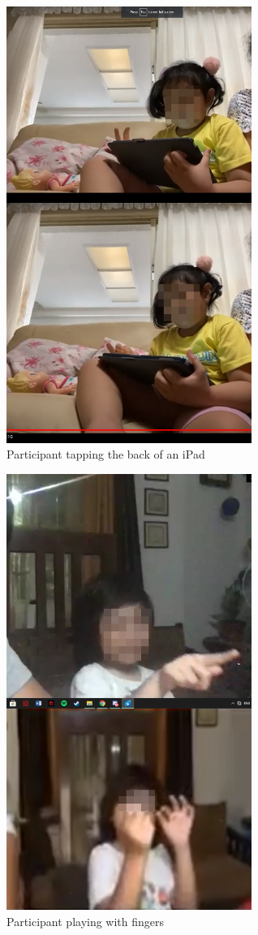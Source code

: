 \begin{figure}[H]
    \centering
    \includegraphics[width=8cm]{figures/Results/UTpictures/Tapping.png}
    \caption{Participant tapping the back of an iPad}
    \label{fig:tappingparticipant}
\end{figure}
\begin{figure}[H]
    \centering
    \includegraphics[width=8cm]{figures/Results/UTpictures/fingerplaying.png}
    \caption{Participant playing with fingers}
    \label{fig:fingeringparticipant}
\end{figure}

